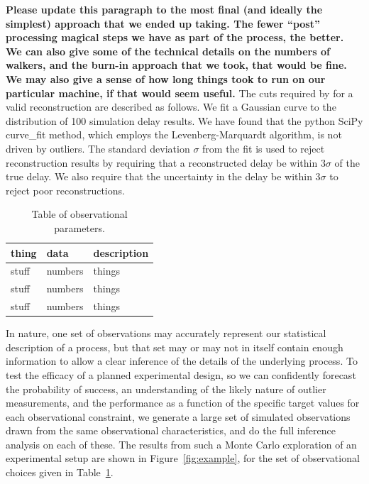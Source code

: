 \documentclass{emulateapj}
\begin{document}
{\bf Please update this paragraph to the most final (and ideally the
  simplest) approach that we ended up taking. The fewer ``post''
  processing magical steps we have as part of the process, the better.
  We can also give some of the technical details on the numbers of
  walkers, and the burn-in approach that we took, that would be fine.
  We may also give a sense of how long things took to run on our
  particular machine, if that would seem useful.}  The cuts required
by for a valid reconstruction are described as follows. We fit a
Gaussian curve to the distribution of 100 simulation delay results. We
have found that the python SciPy curve\_fit method, which employs the
Levenberg-Marquardt algorithm, is not driven by outliers. The standard
deviation $\sigma$ from the fit is used to reject reconstruction
results by requiring that a reconstructed delay be within 3$\sigma$ of
the true delay. We also require that the uncertainty in the delay be
within 3$\sigma$ to reject poor reconstructions.

\begin{table}[htdp]
\caption{Table of observational parameters.}
\begin{center}
\begin{tabular}{lll}
\hline
thing & data & description \\
\hline
\hline
stuff & numbers & things \\
stuff & numbers & things \\
stuff & numbers & things \\
\hline
\end{tabular}
\end{center}
\label{tab:example}
\end{table}

In nature, one set of observations may accurately represent our
statistical description of a process, but that set may or may not in
itself contain enough information to allow a clear inference of the
details of the underlying process. To test the efficacy of a planned
experimental design, so we can confidently forecast the probability of
success, an understanding of the likely nature of outlier
measurements, and the performance as a function of the specific
target values for each observational constraint, we generate a large
set of simulated observations drawn from the same observational
characteristics, and do the full inference analysis on each of these.
The results from such a Monte Carlo exploration of an experimental
setup are shown in Figure~\ref{fig:example}, for the set of
observational choices given in Table~\ref{tab:example}. 
\end{document}
